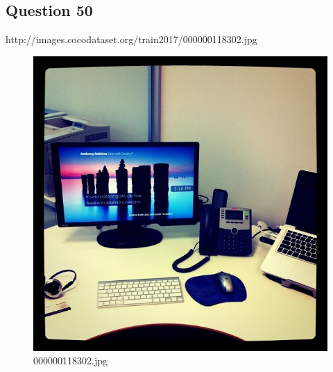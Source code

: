 \subsection*{Question 50}
http://images.cocodataset.org/train2017/000000118302.jpg
\begin{figure}[h]
    \centering
    \includegraphics[width=0.8\linewidth]{../image set/hard/000000118302.jpg}
    \caption{000000118302.jpg}
\end{figure}
